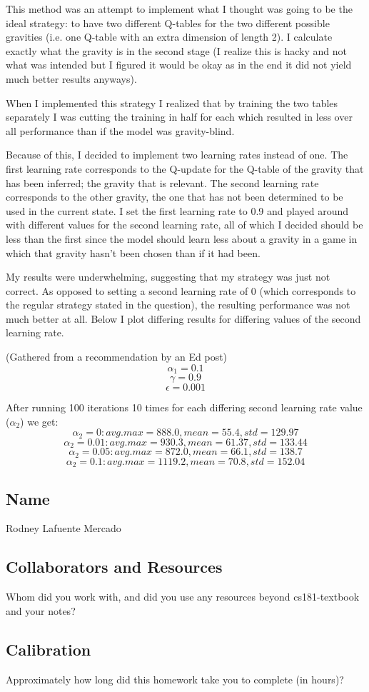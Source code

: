 \documentclass[submit]{harvardml}
\begin{document}
This method was an attempt to implement what I thought was going to be the ideal strategy:
to have two different Q-tables for the two different possible gravities 
(i.e. one Q-table with an extra dimension of length 2). I calculate exactly
what the gravity is in the second stage (I realize this is hacky and not what was intended
but I figured it would be okay as in the end it did not yield much better results anyways).

When I implemented this strategy I realized that by training the two tables separately I was cutting the 
training in half for each which resulted in less over all performance than if the model was 
gravity-blind.

Because of this, I decided to implement two learning rates instead of one. The first learning
rate corresponds to the Q-update for the Q-table of the gravity that has been inferred; the 
gravity that is relevant. The second learning rate corresponds to the other gravity, the one that
has not been determined to be used in the current state. I set the first learning rate to 0.9 and 
played around with different values for the second learning rate, all of which I decided should be 
less than the first since the model should learn less about a gravity in a game in which that gravity
hasn't been chosen than if it had been.

My results were underwhelming, suggesting that my strategy was just not correct. As opposed to setting
a second learning rate of 0 (which corresponds to the regular strategy stated in the question),
the resulting performance was not much better at all. Below I plot differing results for
differing values of the second learning rate.

(Gathered from a recommendation by an Ed post)
$$\alpha_1 = 0.1$$
$$\gamma = 0.9$$
$$\epsilon = 0.001$$

After running 100 iterations 10 times for each differing second learning rate value ($\alpha_2$)
we get:
$$\alpha_2 = 0: avg.max = 888.0, mean = 55.4, std = 129.97$$
$$\alpha_2 = 0.01: avg.max = 930.3, mean = 61.37, std = 133.44$$
$$\alpha_2 = 0.05: avg.max = 872.0, mean = 66.1, std = 138.7$$
$$\alpha_2 = 0.1: avg.max = 1119.2, mean = 70.8, std = 152.04$$




\newpage
\newpage
\newpage
\subsection*{Name}
Rodney Lafuente Mercado
\subsection*{Collaborators and Resources}
Whom did you work with, and did you use any resources beyond cs181-textbook and your notes?
\subsection*{Calibration}
Approximately how long did this homework take you to complete (in hours)? 
\end{document}
